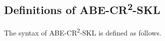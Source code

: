 %
%




\subsection{Definitions of ABE-CR\textsuperscript{2}-SKL}
The syntax of ABE-CR\textsuperscript{2}-SKL is defined as follows. 


